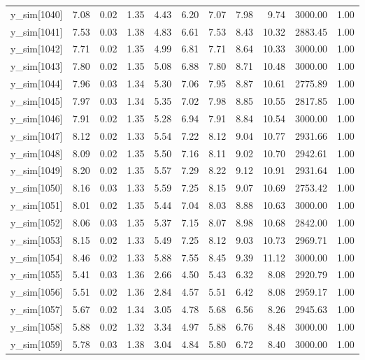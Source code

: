 \begin{table}[ht]
\begin{tabular}{rrrrrrrrrrr}
  y\_sim[1040] & 7.08 & 0.02 & 1.35 & 4.43 & 6.20 & 7.07 & 7.98 & 9.74 & 3000.00 & 1.00 \\ 
  y\_sim[1041] & 7.53 & 0.03 & 1.38 & 4.83 & 6.61 & 7.53 & 8.43 & 10.32 & 2883.45 & 1.00 \\ 
  y\_sim[1042] & 7.71 & 0.02 & 1.35 & 4.99 & 6.81 & 7.71 & 8.64 & 10.33 & 3000.00 & 1.00 \\ 
  y\_sim[1043] & 7.80 & 0.02 & 1.35 & 5.08 & 6.88 & 7.80 & 8.71 & 10.48 & 3000.00 & 1.00 \\ 
  y\_sim[1044] & 7.96 & 0.03 & 1.34 & 5.30 & 7.06 & 7.95 & 8.87 & 10.61 & 2775.89 & 1.00 \\ 
  y\_sim[1045] & 7.97 & 0.03 & 1.34 & 5.35 & 7.02 & 7.98 & 8.85 & 10.55 & 2817.85 & 1.00 \\ 
  y\_sim[1046] & 7.91 & 0.02 & 1.35 & 5.28 & 6.94 & 7.91 & 8.84 & 10.54 & 3000.00 & 1.00 \\ 
  y\_sim[1047] & 8.12 & 0.02 & 1.33 & 5.54 & 7.22 & 8.12 & 9.04 & 10.77 & 2931.66 & 1.00 \\ 
  y\_sim[1048] & 8.09 & 0.02 & 1.35 & 5.50 & 7.16 & 8.11 & 9.02 & 10.70 & 2942.61 & 1.00 \\ 
  y\_sim[1049] & 8.20 & 0.02 & 1.35 & 5.57 & 7.29 & 8.22 & 9.12 & 10.91 & 2931.64 & 1.00 \\ 
  y\_sim[1050] & 8.16 & 0.03 & 1.33 & 5.59 & 7.25 & 8.15 & 9.07 & 10.69 & 2753.42 & 1.00 \\ 
  y\_sim[1051] & 8.01 & 0.02 & 1.35 & 5.44 & 7.04 & 8.03 & 8.88 & 10.63 & 3000.00 & 1.00 \\ 
  y\_sim[1052] & 8.06 & 0.03 & 1.35 & 5.37 & 7.15 & 8.07 & 8.98 & 10.68 & 2842.00 & 1.00 \\ 
  y\_sim[1053] & 8.15 & 0.02 & 1.33 & 5.49 & 7.25 & 8.12 & 9.03 & 10.73 & 2969.71 & 1.00 \\ 
  y\_sim[1054] & 8.46 & 0.02 & 1.33 & 5.88 & 7.55 & 8.45 & 9.39 & 11.12 & 3000.00 & 1.00 \\ 
  y\_sim[1055] & 5.41 & 0.03 & 1.36 & 2.66 & 4.50 & 5.43 & 6.32 & 8.08 & 2920.79 & 1.00 \\ 
  y\_sim[1056] & 5.51 & 0.02 & 1.36 & 2.84 & 4.57 & 5.51 & 6.42 & 8.08 & 2959.17 & 1.00 \\ 
  y\_sim[1057] & 5.67 & 0.02 & 1.34 & 3.05 & 4.78 & 5.68 & 6.56 & 8.26 & 2945.63 & 1.00 \\ 
  y\_sim[1058] & 5.88 & 0.02 & 1.32 & 3.34 & 4.97 & 5.88 & 6.76 & 8.48 & 3000.00 & 1.00 \\ 
  y\_sim[1059] & 5.78 & 0.03 & 1.38 & 3.04 & 4.84 & 5.80 & 6.72 & 8.40 & 3000.00 & 1.00 \\ 

\end{tabular}
\end{table}
